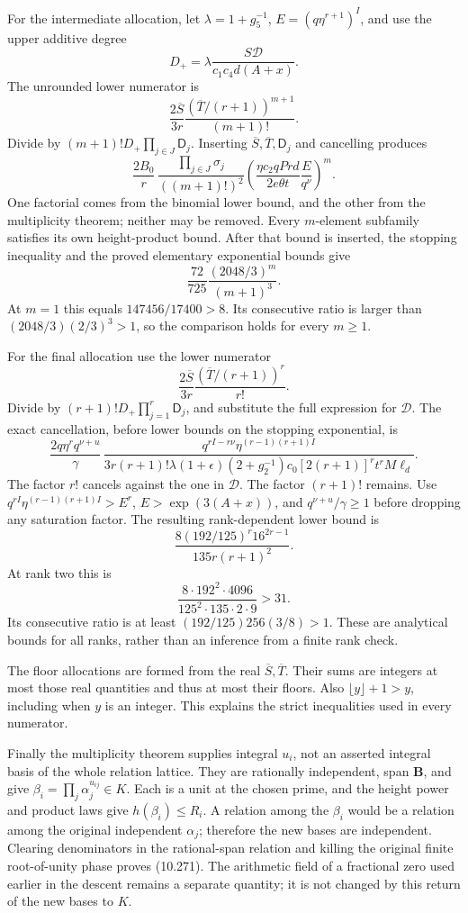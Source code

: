 \documentclass[
  11pt,
  a4paper,
]{article}
\begin{document}
For the intermediate allocation, let \(\lambda=1+g_5^{-1}\),
\(E=(q\eta^{r+1})^I\), and use the upper additive degree \[
D_+=\lambda\frac{S\mathcal D}{c_1c_4d(A+x)}.
\] The unrounded lower numerator is \[
\frac{2\overline S}{3r}
\frac{(\overline T/(r+1))^{m+1}}{(m+1)!}.
\] Divide by \((m+1)!D_+\prod_{j\in J}\mathsf D_j\). Inserting
\(\overline S,\overline T,\mathsf D_j\) and cancelling produces \[
\frac{2B_0}{r}\,
\frac{\prod_{j\in J}\sigma_j}{((m+1)!)^2}
\left(\frac{\eta c_2qPrd}{2e\theta t}\frac E{q^\nu}\right)^m.
\] One factorial comes from the binomial lower bound, and the other from
the multiplicity theorem; neither may be removed. Every \(m\)-element
subfamily satisfies its own height-product bound. After that bound is
inserted, the stopping inequality and the proved elementary exponential
bounds give \[
\frac{72}{725}\frac{(2048/3)^m}{(m+1)^3}.
\] At \(m=1\) this equals \(147456/17400>8\). Its consecutive ratio is
larger than \((2048/3)(2/3)^3>1\), so the comparison holds for every
\(m\ge1\).

For the final allocation use the lower numerator \[
\frac{2\overline S}{3r}
\frac{(\overline T/(r+1))^r}{r!}.
\] Divide by \((r+1)!D_+\prod_{j=1}^r\mathsf D_j\), and substitute the
full expression for \(\mathcal D\). The exact cancellation, before lower
bounds on the stopping exponential, is \[
\frac{2q\eta^r q^{\nu+u}}{\gamma}\,
\frac{q^{rI-r\nu}\eta^{(r-1)(r+1)I}}
{3r(r+1)!\lambda(1+\epsilon)(2+g_2^{-1})c_0
[2(r+1)]^r t^rM\ell_d}.
\] The factor \(r!\) cancels against the one in \(\mathcal D\). The
factor \((r+1)!\) remains. Use \(q^{rI}\eta^{(r-1)(r+1)I}>E^r\),
\(E>\exp(3(A+x))\), and \(q^{\nu+u}/\gamma\ge1\) before dropping any
saturation factor. The resulting rank-dependent lower bound is \[
\frac{8(192/125)^r16^{2r-1}}{135r(r+1)^2}.
\] At rank two this is \[
\frac{8\cdot192^2\cdot4096}{125^2\cdot135\cdot2\cdot9}>31.
\] Its consecutive ratio is at least \((192/125)256(3/8)>1\). These are
analytical bounds for all ranks, rather than an inference from a finite
rank check.

The floor allocations are formed from the real
\(\overline S,\overline T\). Their sums are integers at most those real
quantities and thus at most their floors. Also \(\lfloor y\rfloor+1>y\),
including when \(y\) is an integer. This explains the strict
inequalities used in every numerator.

Finally the multiplicity theorem supplies integral \(u_i\), not an
asserted integral basis of the whole relation lattice. They are
rationally independent, span \(\boldsymbol B\), and give
\(\beta_i=\prod_j\alpha_j^{u_{ij}}\in K\). Each is a unit at the chosen
prime, and the height power and product laws give \(h(\beta_i)\le R_i\).
A relation among the \(\beta_i\) would be a relation among the original
independent \(\alpha_j\); therefore the new bases are independent.
Clearing denominators in the rational-span relation and killing the
original finite root-of-unity phase proves (10.271). The arithmetic
field of a fractional zero used earlier in the descent remains a
separate quantity; it is not changed by this return of the new bases to
\(K\).
\end{document}
